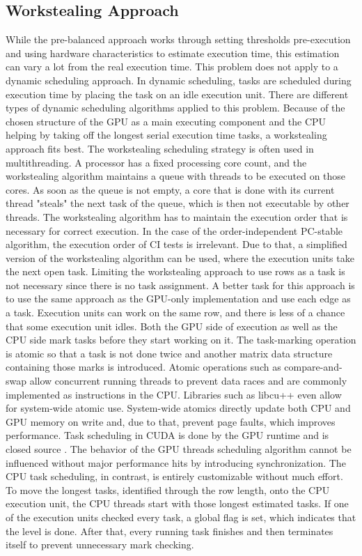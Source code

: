 \subsection{Workstealing Approach}
While the pre-balanced approach works through setting thresholds pre-execution and using hardware characteristics to estimate execution time, this estimation can vary a lot from the real execution time. This problem does not apply to a dynamic scheduling approach. In dynamic scheduling, tasks are scheduled during execution time by placing the task on an idle execution unit. There are different types of dynamic scheduling algorithms applied to this problem.
Because of the chosen structure of the GPU as a main executing component and the CPU helping by taking off the longest serial execution time tasks, a workstealing approach fits best. The workstealing scheduling strategy is often used in multithreading. A processor has a fixed processing core count, and the workstealing algorithm maintains a queue with threads to be executed on those cores. As soon as the queue is not empty, a core that is done with its current thread "steals" the next task of the queue, which is then not executable by other threads. The workstealing algorithm has to maintain the execution order that is necessary for correct execution. \cite{blumofeSchedulingMultithreadedComputations1999}
In the case of the order-independent PC-stable algorithm, the execution order of CI tests is irrelevant. Due to that, a simplified version of the workstealing algorithm can be used, where the execution units take the next open task.
Limiting the workstealing approach to use rows as a task is not necessary since there is no task assignment. A better task for this approach is to use the same approach as the GPU-only implementation and use each edge as a task. Execution units can work on the same row, and there is less of a chance that some execution unit idles.
Both the GPU side of execution as well as the CPU side mark tasks before they start working on it. The task-marking operation is atomic so that a task is not done twice and another matrix data structure containing those marks is introduced. Atomic operations such as compare-and-swap allow concurrent running threads to prevent data races and are commonly implemented as instructions in the CPU.
Libraries such as libcu++ \cite{NVIDIALibcudacxx2021} even allow for system-wide atomic use. System-wide atomics directly update both CPU and GPU memory on write and, due to that, prevent page faults, which improves performance.
Task scheduling in CUDA is done by the GPU runtime and is closed source \cite{olmedoDissectingCUDAScheduling2020}. The behavior of the GPU threads scheduling algorithm cannot be influenced without major performance hits by introducing synchronization. The CPU task scheduling, in contrast, is entirely customizable without much effort. To move the longest tasks, identified through the row length, onto the CPU execution unit, the CPU threads start with those longest estimated tasks.
If one of the execution units checked every task, a global flag is set, which indicates that the level is done. After that, every running task finishes and then terminates itself to prevent unnecessary mark checking.

